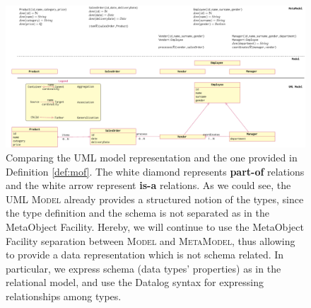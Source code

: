  \begin{figure}
	\centering
	\includegraphics[width=\textheight]{fig/01dataint/umlmodelling2}
	\caption{Comparing the UML model representation and the one provided in Definition \ref{def:mof}. The white diamond represents \textbf{part-of} relations and the white arrow represent  \textbf{is-a} relations. As we could see, the UML \textsc{Model} already provides a structured notion of the types, since the type definition and the schema is not separated as in the MetaObject Facility. Hereby, we will continue to use the MetaObject Facility separation between \textsc{Model} and \textsc{MetaModel}, thus allowing to provide a data representation which is not schema related. In particular, we express schema (data types' properties) as in the relational model, and use the Datalog syntax for expressing relationships among types.}
	\label{fig:umlmodelling2}
\end{figure}

